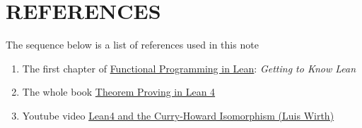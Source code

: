 \chapter{REFERENCES}

The sequence below is a list of references used in this note

\begin{enumerate}
	\item The first chapter of \href{https://lean-lang.org/functional_programming_in_lean/}{Functional Programming in Lean}: \textit{Getting to Know Lean}
	
	\item The whole book \href{https://lean-lang.org/theorem_proving_in_lean4/}{Theorem Proving in Lean 4}
	
	\item Youtube video \href{https://youtu.be/Sy_4z751YWI}{Lean4 and the Curry-Howard Isomorphism (Luis Wirth)}
\end{enumerate}